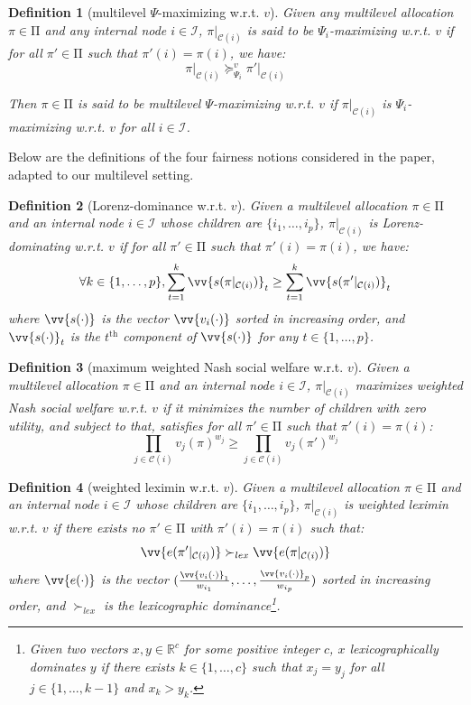 \documentclass[]{article}
\newtheorem{definition}{Definition}
\newcommand{\children}{\mathcal{C}}
\newcommand{\internal}{\mathcal{I}}
\newcommand{\mallocations}{\mathrm{\Pi}}
\begin{document}
\begin{definition}[multilevel $\Psi$-maximizing w.r.t. $v$]  \label{def: multilevel psi} Given any multilevel allocation $\pi \in \mallocations$ and any internal node $i \in \internal$, $\pi \vert_{\children(i)}$ is said to be \emph{$\Psi_i$-maximizing w.r.t. $v$} if for all $\pi' \in \mallocations$ such that $\pi'(i) = \pi(i)$, we have:
$$
\pi \vert_{\children(i)} \succeq_{\Psi_i}^v \pi' \vert_{\children(i)}
$$


\noindent Then $\pi \in \mallocations$ is said to be \emph{multilevel $\Psi$-maximizing w.r.t. $v$} if $\pi \vert_{\children(i)}$ is $\Psi_i$-maximizing w.r.t. $v$ for all $i \in \internal$.
\end{definition}

\noindent Below are the definitions of the four fairness notions considered in the paper, adapted to our multilevel setting.


\begin{definition}[Lorenz-dominance w.r.t. $v$] Given a multilevel allocation $\pi \in \mallocations$ and an internal node $i \in \internal$ whose children are $\{i_1,\ldots, i_p\}$, $\pi \vert_{\children(i)}$ is \emph{Lorenz-dominating w.r.t. $v$} if for all $\pi' \in \mallocations$ such that $\pi'(i) = \pi(i)$, we have:
$$ \forall k \in \{1,\ldots, p\}, 
\sum_{t=1}^k \vv{s(\pi|_{\children(i)})}_t \geq \sum_{t=1}^k \vv{s(\pi'|_{\children(i)})}_t
$$
where $\vv{s(\cdot)}$ is the vector $\vv{v_i(\cdot)}$ sorted in increasing order, and $\vv{s(\cdot)}_t$ is the $t^{\text{th}}$ component of $\vv{s(\cdot)}$ for any $t \in \{1, \ldots, p\}$.
\end{definition}

\begin{definition}[maximum weighted Nash social welfare w.r.t. $v$] Given a multilevel allocation $\pi \in \mallocations$ and an internal node $i \in \internal$, $\pi \vert_{\children(i)}$ \emph{maximizes weighted Nash social welfare w.r.t. $v$} if it minimizes the number of children with zero utility, and subject to that, satisfies for all $\pi' \in \mallocations$ such that $\pi'(i) = \pi(i)$:  
$$
\prod_{j \in \children(i)} v_{j}(\pi)^{w_{j}} \geq \prod_{j \in \children(i)} v_{j}(\pi')^{w_{j}}
$$
\end{definition}

\begin{definition}[weighted leximin w.r.t. $v$] Given a multilevel allocation $\pi \in \mallocations$ and an internal node $i \in \internal$ whose children are $\{i_1,\ldots, i_p\}$, $\pi \vert_{\children(i)}$ is \emph{weighted leximin w.r.t. $v$} if there exists no $\pi' \in \mallocations$ with $\pi'(i) = \pi(i)$ such that:
$$
\vv{e(\pi' \vert_{\children(i)})} \succ_{lex} \vv{e(\pi \vert_{\children(i)})}
$$
where $\vv{e(\cdot)}$ is the vector $(\frac{\vv{v_i(\cdot)}_1}{w_{i_1}}, \ldots, \frac{\vv{v_i(\cdot)}_p}{w_{i_p}})$ sorted in increasing order, and $\succ_{lex}$ is the lexicographic dominance\footnote{Given two vectors $x, y \in \mathbb{R}^c$ for some positive integer $c$, $x$ \emph{lexicographically dominates} $y$ if there exists $k \in \{1, \ldots, c\}$ such that $x_j = y_j$ for all $j \in \{1, \ldots, k-1\}$ and $x_k > y_k$.}. 
\end{definition}
\end{document}
